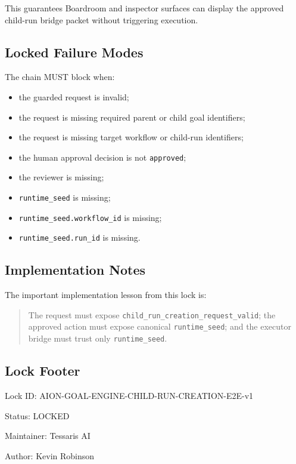 This guarantees Boardroom and inspector surfaces can display the approved child-run bridge packet without triggering execution.

\subsection{Locked Failure Modes}

The chain MUST block when:

\begin{itemize}
  \item the guarded request is invalid;
  \item the request is missing required parent or child goal identifiers;
  \item the request is missing target workflow or child-run identifiers;
  \item the human approval decision is not \texttt{approved};
  \item the reviewer is missing;
  \item \texttt{runtime\_seed} is missing;
  \item \texttt{runtime\_seed.workflow\_id} is missing;
  \item \texttt{runtime\_seed.run\_id} is missing.
\end{itemize}

\subsection{Implementation Notes}

The important implementation lesson from this lock is:

\begin{quote}
The request must expose \texttt{child\_run\_creation\_request\_valid}; the approved action must expose canonical \texttt{runtime\_seed}; and the executor bridge must trust only \texttt{runtime\_seed}.
\end{quote}

\subsection{Lock Footer}

Lock ID: AION-GOAL-ENGINE-CHILD-RUN-CREATION-E2E-v1

Status: LOCKED

Maintainer: Tessaris AI

Author: Kevin Robinson

